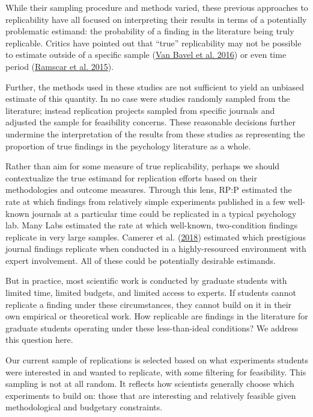 \documentclass[
  english,
  a4paper,
]{article}
\begin{document}
While their sampling procedure and methods varied, these previous approaches to replicability have all focused on interpreting their results in terms of a potentially problematic estimand: the probability of a finding in the literature being truly replicable. Critics have pointed out that ``true'' replicability may not be possible to estimate outside of a specific sample (\protect\hyperlink{ref-vanbavel2016}{Van Bavel et al. 2016}) or even time period (\protect\hyperlink{ref-ramscar2015}{Ramscar et al. 2015}).

Further, the methods used in these studies are not sufficient to yield an unbiased estimate of this quantity. In no case were studies randomly sampled from the literature; instead replication projects sampled from specific journals and adjusted the sample for feasibility concerns. These reasonable decisions further undermine the interpretation of the results from these studies as representing the proportion of true findings in the psychology literature as a whole.

Rather than aim for some measure of true replicability, perhaps we should contextualize the true estimand for replication efforts based on their methodologies and outcome measures. Through this lens, RP:P estimated the rate at which findings from relatively simple experiments published in a few well-known journals at a particular time could be replicated in a typical psychology lab. Many Labs estimated the rate at which well-known, two-condition findings replicate in very large samples. Camerer et al. (\protect\hyperlink{ref-camerer2018}{2018}) estimated which prestigious journal findings replicate when conducted in a highly-resourced environment with expert involvement. All of these could be potentially desirable estimands.

But in practice, most scientific work is conducted by graduate students with limited time, limited budgets, and limited access to experts. If students cannot replicate a finding under these circumstances, they cannot build on it in their own empirical or theoretical work. How replicable are findings in the literature for graduate students operating under these less-than-ideal conditions? We address this question here.

Our current sample of replications is selected based on what experiments students were interested in and wanted to replicate, with some filtering for feasibility. This sampling is not at all random. It reflects how scientists generally choose which experiments to build on: those that are interesting and relatively feasible given methodological and budgetary constraints.
\end{document}
